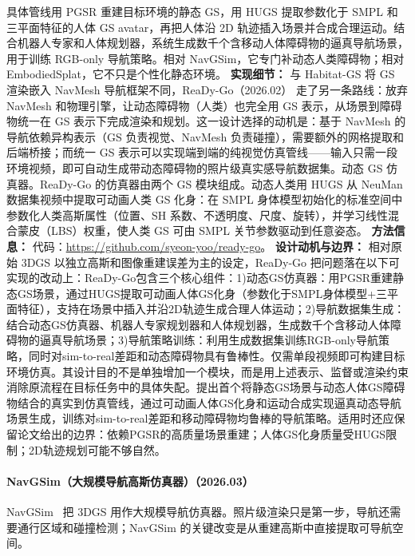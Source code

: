 具体管线用 PGSR 重建目标环境的静态 GS，用 HUGS 提取参数化于 SMPL 和三平面特征的人体 GS avatar，再把人体沿 2D 轨迹插入场景并合成合理运动。结合机器人专家和人体规划器，系统生成数千个含移动人体障碍物的逼真导航场景，用于训练 RGB-only 导航策略。相对 NavGSim，它专门补动态人类障碍物；相对 EmbodiedSplat，它不只是个性化静态环境。
\textbf{实现细节：} 与 Habitat-GS 将 GS 渲染嵌入 NavMesh 导航框架不同，ReaDy-Go（2026.02） 走了另一条路线：放弃 NavMesh 和物理引擎，让动态障碍物（人类）也完全用 GS 表示，从场景到障碍物统一在 GS 表示下完成渲染和规划。这一设计选择的动机是：基于 NavMesh 的导航依赖异构表示（GS 负责视觉、NavMesh 负责碰撞），需要额外的网格提取和后端桥接；而统一 GS 表示可以实现端到端的纯视觉仿真管线——输入只需一段环境视频，即可自动生成带动态障碍物的照片级真实感导航数据集。动态 GS 仿真器。ReaDy-Go 的仿真器由两个 GS 模块组成。动态人类用 HUGS 从 NeuMan 数据集视频中提取可动画人类 GS 化身：在 SMPL 身体模型初始化的标准空间中参数化人类高斯属性（位置、SH 系数、不透明度、尺度、旋转），并学习线性混合蒙皮（LBS）权重，使人类 GS 可由 SMPL 关节参数驱动到任意姿态。
\textbf{方法信息：} 代码：\url{https://github.com/syeon-yoo/ready-go}。
\textbf{设计动机与边界：} 相对原始 3DGS 以独立高斯和图像重建误差为主的设定，ReaDy-Go 把问题落在以下可实现的改动上：ReaDy-Go包含三个核心组件：1)动态GS仿真器：用PGSR重建静态GS场景，通过HUGS提取可动画人体GS化身（参数化于SMPL身体模型+三平面特征），支持在场景中插入并沿2D轨迹生成合理人体运动；2)导航数据集生成：结合动态GS仿真器、机器人专家规划器和人体规划器，生成数千个含移动人体障碍物的逼真导航场景；3)导航策略训练：利用生成数据集训练RGB-only导航策略，同时对sim-to-real差距和动态障碍物具有鲁棒性。仅需单段视频即可构建目标环境仿真。其设计目的不是单独增加一个模块，而是用上述表示、监督或渲染约束消除原流程在目标任务中的具体失配。提出首个将静态GS场景与动态人体GS障碍物结合的真实到仿真管线，通过可动画人体GS化身和运动合成实现逼真动态导航场景生成，训练对sim-to-real差距和移动障碍物均鲁棒的导航策略。适用时还应保留论文给出的边界：依赖PGSR的高质量场景重建；人体GS化身质量受HUGS限制；2D轨迹规划可能不够自然。
\paragraph{NavGSim（大规模导航高斯仿真器）（2026.03）}
NavGSim~\cite{2603_15186} 把 3DGS 用作大规模导航仿真器。照片级渲染只是第一步，导航还需要通行区域和碰撞检测；NavGSim 的关键改变是从重建高斯中直接提取可导航空间。

